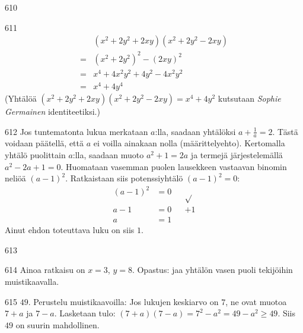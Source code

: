 \begin{Vastaus}{610}
    
\end{Vastaus}
\begin{Vastaus}{611}
	\begin{align*}
		&(x^2+2y^2+2xy)(x^2+2y^2-2xy) \\
		=&(x^2+2y^2)^2-(2xy)^2 \\
		=&x^4+4x^2y^2+4y^2-4x^2y^2 \\
		=&x^4+4y^4
	\end{align*}
	(Yhtälöä $(x^2+2y^2+2xy)(x^2+2y^2-2xy)=x^4+4y^2$ kutsutaan \textit{Sophie Germainen} identiteetiksi.)
	
\end{Vastaus}
\begin{Vastaus}{612}
	Jos tuntematonta lukua merkataan $a$:lla, saadaan yhtälöksi $a+\frac{1}{a}=2$. Tästä voidaan päätellä, että $a$ ei voilla ainakaan nolla (määrittelyehto). Kertomalla yhtälö puolittain $a$:lla, saadaan muoto $a^2+1=2a$ ja termejä järjestelemällä $a^2-2a+1=0$. Huomataan vasemman puolen lausekkeen vastaavan binomin neliöä $(a-1)^2$. Ratkaistaan siis potenssiyhtälö $(a-1)^2=0$:
	\begin{align*}
(a-1)^2&=0 &&\sqrt{ } \\
a-1&=0 &&+1 \\
a&=1 &&
	\end{align*}
	Ainut ehdon toteuttava luku on siis $1$.
	
\end{Vastaus}
\begin{Vastaus}{613}
    
\end{Vastaus}
\begin{Vastaus}{614}
    Ainoa ratkaisu on $x = 3$, $y=8$. Opastus: jaa yhtälön vasen puoli tekijöihin muistikaavalla.
    
\end{Vastaus}
\begin{Vastaus}{615}
        $49$. Perustelu muistikaavoilla: Jos lukujen keskiarvo on $7$, ne ovat muotoa $7+a$ ja $7-a$. Lasketaan tulo: $(7+a)(7-a)=7^2-a^2 = 49-a^2 \geq 49$. Siis $49$ on suurin mahdollinen.
    
\end{Vastaus}
